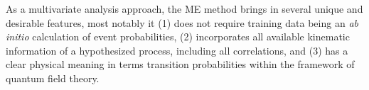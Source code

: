 As a multivariate analysis approach, the ME method brings in several
unique and desirable features, most notably it (1) does not require
training data being an \emph{ab initio} calculation of event
probabilities, (2) incorporates all available kinematic information of
a hypothesized process, including all correlations, and (3) has a
clear physical meaning in terms transition probabilities within the
framework of quantum field theory.
